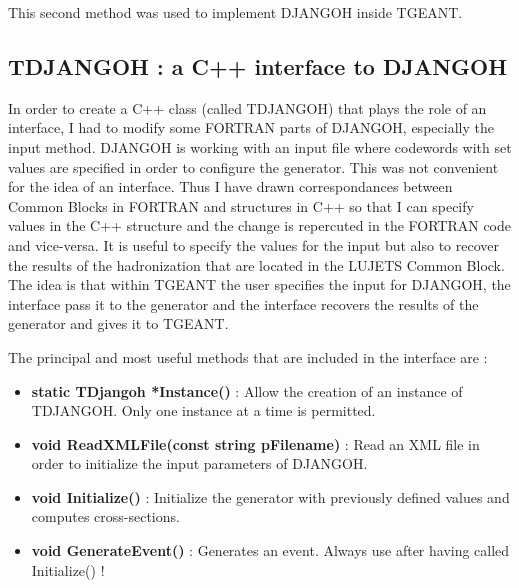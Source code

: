 \documentclass[letterpaper,12pt]{article}
\begin{document}
This second method was used to implement DJANGOH inside TGEANT.

\subsection{TDJANGOH : a C++ interface to DJANGOH}

In order to create a C++ class (called TDJANGOH) that plays the role of an interface, I had to modify some
FORTRAN parts of DJANGOH, especially the input method. DJANGOH is working with an input
file where codewords with set values are specified in order to configure the generator.
This was not convenient for the idea of an interface. Thus I have drawn
correspondances between Common Blocks in FORTRAN and structures in C++ so that I can specify
values in the C++ structure and the change is repercuted in the FORTRAN code and vice-versa.
It is useful to specify the values for the input but also to recover the results of the
hadronization that are located in the LUJETS Common Block.
The idea is that within TGEANT the user specifies the input for DJANGOH, the interface
pass it to the generator and the interface recovers the results of the generator and gives
it to TGEANT.

\newpage

The principal and most useful methods that are included in the interface are :
\begin{itemize}
\item \textbf{{\color{orange}static} TDjangoh *Instance()} : Allow the creation of an instance of TDJANGOH. Only one
instance at a time is permitted.
\item \textbf{{\color{orange}void} ReadXMLFile(const string pFilename)} : Read an XML file in order to initialize the input
parameters of DJANGOH.
\item \textbf{{\color{orange}void} Initialize()} : Initialize the generator with previously defined values and computes cross-sections.
\item \textbf{{\color{orange}void} GenerateEvent()} : Generates an event. Always use after having called Initialize() !
\end{itemize}
\end{document}
